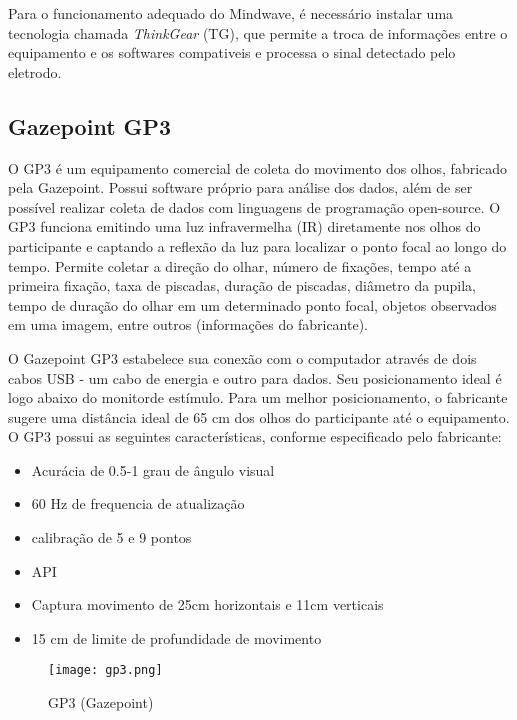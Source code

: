 Para o funcionamento adequado do Mindwave, é necessário instalar uma tecnologia 
chamada \textit{ThinkGear} (TG), que permite a troca de informações entre o equipamento 
e os softwares compativeis e processa o sinal detectado pelo eletrodo. 


\subsection{Gazepoint GP3}

O GP3 é um equipamento comercial de coleta do movimento dos olhos, 
fabricado pela Gazepoint. Possui software próprio para análise dos dados, 
além de ser possível realizar coleta de dados com linguagens de programação open-source. O GP3 funciona emitindo uma luz infravermelha (IR) 
diretamente nos olhos do participante e captando a reflexão da luz para localizar o ponto focal ao longo do tempo. 
Permite coletar a direção do olhar, número de fixações, tempo até a primeira fixação, taxa de piscadas,
 duração de piscadas, diâmetro da pupila, tempo de duração do olhar em um determinado ponto focal, 
 objetos observados em uma imagem, entre outros (informações do fabricante).

O Gazepoint GP3 estabelece sua conexão com o computador através de dois cabos USB - um cabo de energia e outro para dados.
Seu posicionamento ideal é logo abaixo do monitorde estímulo. Para um melhor posicionamento, o fabricante 
sugere uma distância ideal de 65 cm dos olhos do participante até o equipamento. O GP3 possui as seguintes características, conforme
especificado pelo fabricante:

\begin{itemize}
    \item Acurácia de 0.5-1 grau de ângulo visual
    \item 60 Hz de frequencia de atualização
    \item calibração de 5 e 9 pontos
    \item API
    \item Captura movimento de 25cm horizontais e 11cm verticais
    \item 15 cm de limite de profundidade de movimento
\end{itemize}

\begin{figure}
    \centering
    \texttt{[image: gp3.png]}
    \caption{GP3 (Gazepoint)}
\end{figure}

